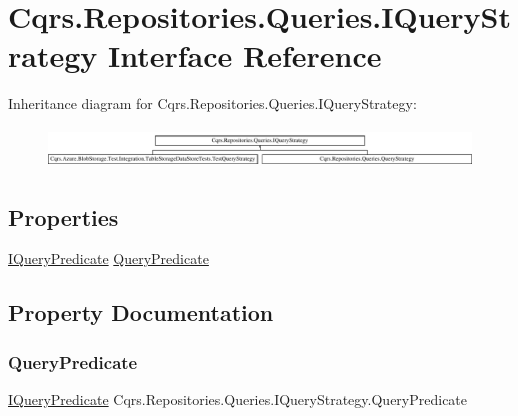 \hypertarget{interfaceCqrs_1_1Repositories_1_1Queries_1_1IQueryStrategy}{}\section{Cqrs.\+Repositories.\+Queries.\+I\+Query\+Strategy Interface Reference}
\label{interfaceCqrs_1_1Repositories_1_1Queries_1_1IQueryStrategy}
Inheritance diagram for Cqrs.\+Repositories.\+Queries.\+I\+Query\+Strategy\+:\begin{figure}[H]
\begin{center}
\leavevmode
\includegraphics[height=1.074856cm]{interfaceCqrs_1_1Repositories_1_1Queries_1_1IQueryStrategy}
\end{center}
\end{figure}
\subsection*{Properties}
\begin{DoxyCompactItemize}
\item 
\hyperlink{interfaceCqrs_1_1Repositories_1_1Queries_1_1IQueryPredicate}{I\+Query\+Predicate} \hyperlink{interfaceCqrs_1_1Repositories_1_1Queries_1_1IQueryStrategy_ab36e17425ab9940bfa4f104e7f321b90}{Query\+Predicate}
\end{DoxyCompactItemize}


\subsection{Property Documentation}
\mbox{\label{interfaceCqrs_1_1Repositories_1_1Queries_1_1IQueryStrategy_ab36e17425ab9940bfa4f104e7f321b90}} 
\subsubsection{\texorpdfstring{Query\+Predicate}{QueryPredicate}}
{\footnotesize\ttfamily \hyperlink{interfaceCqrs_1_1Repositories_1_1Queries_1_1IQueryPredicate}{I\+Query\+Predicate} Cqrs.\+Repositories.\+Queries.\+I\+Query\+Strategy.\+Query\+Predicate\hspace{0.3cm}{\ttfamily [get]}}

